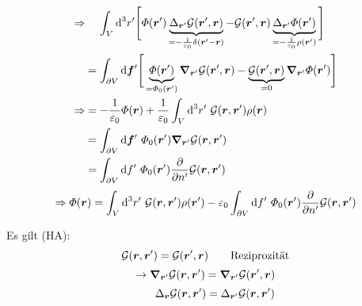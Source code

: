 \begin{align*}
\Rightarrow & \ \ \ \, \int_V \textrm{d}^3 r' \Bigg[ \varPhi(\bm{r}') \underbrace{\Delta_{\bm{r}'} \mathcal{G}(\bm{r}',\bm{r})}_{= -\frac{1}{\varepsilon_0} \delta(\bm{r}' - \bm{r})} - \mathcal{G}(\bm{r}',\bm{r}) \underbrace{\Delta_{\bm{r}'} \varPhi(\bm{r}')}_{= - \frac{1}{\varepsilon_0} \rho(\bm{r}')} \Bigg]\\
&= \int_{\partial V} \textrm{d}\bm{f}' \Bigg[ \underbrace{\varPhi(\bm{r}')}_{= \varPhi_0(\bm{r}')} \bm{\nabla}_{\bm{r}'} \mathcal{G}(\bm{r}',\bm{r}) - \underbrace{\mathcal{G}(\bm{r}',\bm{r})}_{= 0} \bm{\nabla}_{\bm{r}'} \varPhi(\bm{r}') \Bigg]\\
\Rightarrow &= - \frac{1}{\varepsilon_0} \varPhi(\bm{r}) + \frac{1}{\varepsilon_0} \int_V \textrm{d}^3 r'\ \mathcal G(\bm{r}, \bm{r}') \rho(\bm{r})\\
&= \int_{\partial V} \textrm{d} \bm{f}'\ \varPhi_0 (\bm{r}') \bm{\nabla}_{\bm{r}'} \mathcal G(\bm{r}, \bm{r}')\\
&= \int_{\partial V} \textrm{d} f'\ \varPhi_0 (\bm{r}') \frac{\partial }{\partial n'} \mathcal{G}(\bm{r}, \bm{r}')
\end{align*}
\begin{equation*}
\Rightarrow \varPhi(\bm{r}) = \int_V \textrm{d}^3r'\ \mathcal G(\bm{r}, \bm{r}') \rho(\bm{r}') - \varepsilon_0 \int_{\partial V} \textrm{d} f'\ \varPhi_0 (\bm{r}') \frac{\partial }{\partial n'} \mathcal{G} (\bm{r}, \bm{r}')
\end{equation*}

Es gilt (HA):
\begin{equation*}
\mathcal{G}(\bm{r},\bm{r}') = \mathcal{G}(\bm{r}',\bm{r}) \qquad \textrm{Reziprozität}
\end{equation*}
\begin{equation*}
\rightarrow \bm{\nabla}_{\bm{r}'} \mathcal{G}(\bm{r},\bm{r}') = \bm{\nabla}_{\bm{r}'} \mathcal{G}(\bm{r}',\bm{r})
\end{equation*}
\begin{equation*}
\phantom{\rightarrow} \ \ \Delta_{\bm{r}} \mathcal{G}(\bm{r},\bm{r}') = \Delta_{\bm{r}'} \mathcal{G}(\bm{r},\bm{r}')
\end{equation*}

\vspace{10pt}



